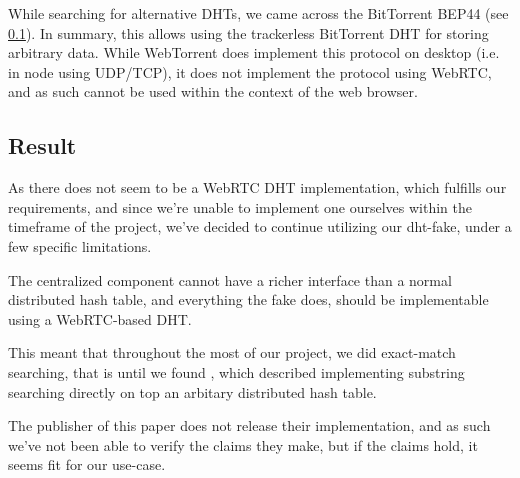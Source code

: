 While searching for alternative DHTs, we came across the BitTorrent BEP44 (see
\ref{}). In summary, this allows using the trackerless BitTorrent DHT for 
storing arbitrary data. While WebTorrent does implement this protocol on 
desktop (i.e. in node using UDP/TCP), it does not implement the protocol using
WebRTC, and as such cannot be used within the context of the web browser.

\subsection{Result}
As there does not seem to be a WebRTC DHT implementation, which fulfills our 
requirements, and since we're unable to implement one ourselves within the 
timeframe of the project, we've decided to continue utilizing our dht-fake,
under a few specific limitations.

The centralized component cannot have a richer interface than a normal
distributed hash table, and everything the fake does, should be implementable
using a WebRTC-based DHT.

This meant that throughout the most of our project, we did exact-match
searching, that is until we found \citep{}, which described implementing
substring searching directly on top an arbitary distributed hash table.

The publisher of this paper does not release their implementation, and as such
we've not been able to verify the claims they make, but if the claims hold, it
seems fit for our use-case.
